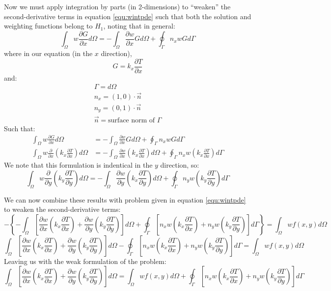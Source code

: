 \documentclass[letterpaper,10pt]{article}
\begin{document}
\noindent Now we must apply integration by parts (in 2-dimensions) to ``weaken'' the second-derivative terms in equation \ref{equ:wintpde} such that both the solution and weighting functions belong to $H_1$, noting that in general:
\[\int_\Omega w \frac{\partial G}{\partial x}d\Omega = -\int_\Omega \frac{\partial w}{\partial x}Gd\Omega + \oint_\Gamma n_xwGd\Gamma\]
\noindent where in our equation (in the $x$ direction),
\[G = k_x\frac{\partial T}{\partial x}\]
\noindent and:
\[\begin{array}{l}
\Gamma = d\Omega \\
n_x = \left(1,0\right) \cdot \vec{n} \\
n_y = \left(0,1\right) \cdot \vec{n} \\
\vec{n} = \text{surface norm of } \Gamma
\end{array}\]
\noindent Such that:
\[\begin{split}
	\int_\Omega w \frac{\partial G}{\partial x}d\Omega &= -\int_\Omega \frac{\partial w}{\partial x}Gd\Omega + \oint_\Gamma n_xwGd\Gamma \\
	\int_\Omega w \frac{\partial}{\partial x}\left(k_x\frac{\partial T}{\partial x}\right)d\Omega &= -\int_\Omega \frac{\partial w}{\partial x}\left(k_x\frac{\partial T}{\partial x}\right)d\Omega + \oint_\Gamma n_xw\left(k_x\frac{\partial T}{\partial x}\right)d\Gamma
\end{split}\]
\noindent We note that this formulation is indentical in the $y$ direction, so:
\[\int_\Omega w \frac{\partial}{\partial y}\left(k_y\frac{\partial T}{\partial y}\right)d\Omega = -\int_\Omega \frac{\partial w}{\partial y}\left(k_x\frac{\partial T}{\partial y}\right)d\Omega + \oint_\Gamma n_yw\left(k_y\frac{\partial T}{\partial y}\right)d\Gamma\]

\noindent We can now combine these results with problem given in equation \ref{equ:wintpde} to weaken the second-derivative terms:
\[-\left\{-\int_\Omega \left[\frac{\partial w}{\partial x}\left(k_x\frac{\partial T}{\partial x}\right) + \frac{\partial w}{\partial y}\left(k_y\frac{\partial T}{\partial y}\right) \right]d\Omega + \oint_\Gamma \left[n_xw\left(k_x\frac{\partial T}{\partial x}\right) + n_yw\left(k_y\frac{\partial T}{\partial y}\right)\right]d\Gamma\right\} = \int_\Omega wf(x,y)d\Omega\]
\[\int_\Omega \left[\frac{\partial w}{\partial x}\left(k_x\frac{\partial T}{\partial x}\right) + \frac{\partial w}{\partial y}\left(k_y\frac{\partial T}{\partial y}\right) \right]d\Omega - \oint_\Gamma \left[n_xw\left(k_x\frac{\partial T}{\partial x}\right) + n_yw\left(k_y\frac{\partial T}{\partial y}\right)\right]d\Gamma = \int_\Omega wf(x,y)d\Omega\]
\noindent Leaving us with the weak formulation of the problem:
\begin{equation}
\label{equ:weak}
\boxed{\int_\Omega \left[\frac{\partial w}{\partial x}\left(k_x\frac{\partial T}{\partial x}\right) + \frac{\partial w}{\partial y}\left(k_y\frac{\partial T}{\partial y}\right) \right]d\Omega = \int_\Omega wf(x,y)d\Omega + \oint_\Gamma \left[n_xw\left(k_x\frac{\partial T}{\partial x}\right) + n_yw\left(k_y\frac{\partial T}{\partial y}\right)\right]d\Gamma}
\end{equation}
\end{document}

